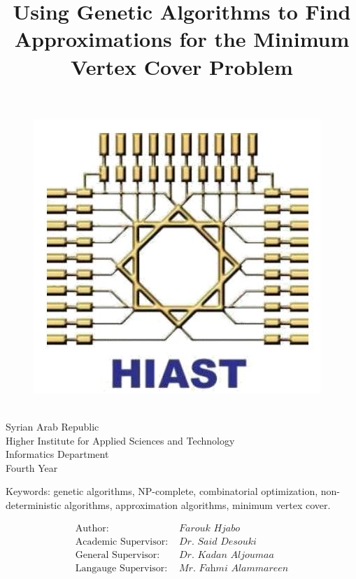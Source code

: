 \documentclass[12pt]{article}
\title{Using Genetic Algorithms to Find Approximations for the Minimum Vertex Cover Problem}
\author{}
\date{}
\newcommand{\lineSeparationLength}{2mm}
\begin{document}
\cleardoublepage{}

{
\begin{figure}
\hfill
\includegraphics[width=0.9\linewidth]{hiast}
\end{figure}

\ \\[\lineSeparationLength]
Syrian Arab Republic \\[\lineSeparationLength]
Higher Institute for Applied Sciences and Technology \\[\lineSeparationLength]
Informatics Department \\[\lineSeparationLength]
Fourth Year
}

\vspace{25mm}
{\let\newpage\relax\maketitle}

\vspace{-10mm}
\begin{center}
Keywords: genetic algorithms, NP-complete, combinatorial optimization, non-deterministic algorithms, approximation algorithms, minimum vertex cover.
\end{center}

\vspace{5mm}
\begin{center}
\begin{align*}
\text{Author: }					& \textit{Farouk Hjabo} \\
\text{Academic Supervisor: }	& \textit{Dr. Said Desouki} \\
\text{General Supervisor: }		& \textit{Dr. Kadan Aljoumaa} \\
\text{Langauge Supervisor: }	& \textit{Mr. Fahmi Alammareen} \\
\end{align*}
\end{center}
\end{document}
